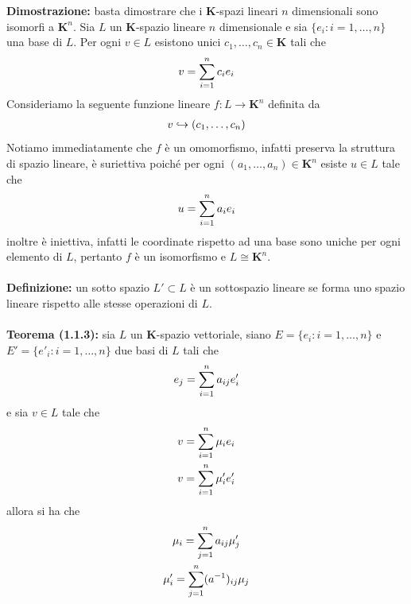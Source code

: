 \documentclass{article}
\begin{document}
\textbf{Dimostrazione:} basta dimostrare che i $\mathbf{K}$-spazi lineari $n$ dimensionali sono isomorfi a $\mathbf{K}^n$. Sia $L$ un $\mathbf{K}$-spazio lineare $n$ dimensionale e sia $\{e_i : i = 1, \dots, n\}$ una base di $L$. Per ogni $v \in L$ esistono unici $c_1, \dots, c_n \in \mathbf{K}$ tali che
\begin{gather}
    v = \sum_{i = 1}^n c_ie_i \notag
\end{gather}
Consideriamo la seguente funzione lineare $f : L \longrightarrow \mathbf{K}^n$ definita da
\begin{gather}
    v \hookrightarrow (c_1, \dots, c_n) \notag
\end{gather}
Notiamo immediatamente che $f$ è un omomorfismo, infatti preserva la struttura di spazio lineare, è suriettiva poiché per ogni $(a_1, \dots, a_n) \in \mathbf{K}^n$ esiste $u \in L$ tale che
\begin{gather}
    u = \sum_{i = 1}^n a_ie_i \notag
\end{gather}
inoltre è iniettiva, infatti le coordinate rispetto ad una base sono uniche per ogni elemento di $L$, pertanto $f$ è un isomorfismo e $L \cong \mathbf{K}^n$. \\ \\
\textbf{Definizione:} un sotto spazio $L' \subset L$ è un sottospazio lineare se forma uno spazio lineare rispetto alle stesse operazioni di $L$. \\ \\
\textbf{Teorema (1.1.3):} sia $L$ un $\mathbf{K}$-spazio vettoriale, siano $E = \{e_i : i = 1, \dots, n\}$ e $E' = \{e'_i : i = 1, \dots, n\}$ due basi di $L$ tali che
\begin{gather}
    e_j = \sum_{i = 1}^n a_{ij}e'_i \notag
\end{gather}
e sia $v \in L$ tale che
\begin{gather}
    v = \sum_{i = 1}^n \mu_ie_i \notag \\
    v = \sum_{i = 1}^n \mu'_ie'_i \notag
\end{gather}
allora si ha che
\begin{gather}
    \mu_i = \sum_{j = 1}^n a_{ij}\mu'_j \notag \\
    \mu'_i = \sum_{j = 1}^n (a^{-1})_{ij}\mu_j \notag
\end{gather}
\end{document}
